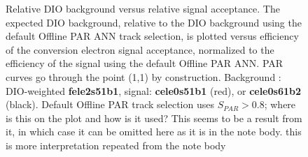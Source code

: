 \begin{figure}[H]
\caption{
  \label{fig:mumem_ann_operational_point_choice}
   {\blue Relative DIO background versus relative signal acceptance.}
  {\blue The e}xpected DIO background,  {\blue relative to} the DIO background  {\blue using the}
  default  {\blue Offline} PAR ANN track selection, is plotted versus efficiency  
  {\blue of the conversion electron signal acceptance}, normalized to the efficiency
  of the  {\blue signal using the default Offline} PAR ANN. 
  PAR curves go through  {\blue the point (1,1)} by construction.
  Background : DIO-weighted {\bf fele2s51b1},  signal: {\bf cele0s51b1} (red), or {\bf cele0s61b2} (black).
  {\blue Default Offline} PAR track selection {\blue uses} $S_{PAR} > 0.8$;  
  {\blue where is this on the plot and how is it used? This seems to be a result from it, in which case it can be omitted here as it is in the note body.}
   {\blue this is more interpretation repeated from the note body}
}
\end{figure}

